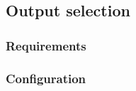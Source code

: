 

\subsection{Output selection}\label{sec:outputselection}

\subsubsection{Requirements}

\subsubsection{Configuration}
